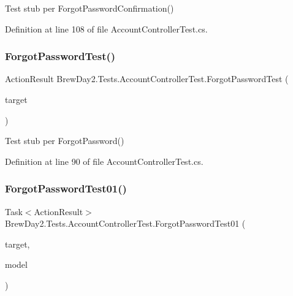 Test stub per Forgot\+Password\+Confirmation()



Definition at line 108 of file Account\+Controller\+Test.\+cs.

\mbox{\label{class_brew_day2_1_1_tests_1_1_account_controller_test_a3b8646f50c34fc99c5767b20461b66cf}} 
\subsubsection{\texorpdfstring{Forgot\+Password\+Test()}{ForgotPasswordTest()}}
{\footnotesize\ttfamily Action\+Result Brew\+Day2.\+Tests.\+Account\+Controller\+Test.\+Forgot\+Password\+Test (\begin{DoxyParamCaption}\item[{\mbox{[}\+Pex\+Assume\+Under\+Test\mbox{]} \mbox{\hyperlink{class_brew_day2_1_1_controllers_1_1_account_controller}{Account\+Controller}}}]{target }\end{DoxyParamCaption})}



Test stub per Forgot\+Password()



Definition at line 90 of file Account\+Controller\+Test.\+cs.

\mbox{\label{class_brew_day2_1_1_tests_1_1_account_controller_test_a11dd2465f4643196ccf6b56cf41d7841}} 
\subsubsection{\texorpdfstring{Forgot\+Password\+Test01()}{ForgotPasswordTest01()}}
{\footnotesize\ttfamily Task$<$Action\+Result$>$ Brew\+Day2.\+Tests.\+Account\+Controller\+Test.\+Forgot\+Password\+Test01 (\begin{DoxyParamCaption}\item[{\mbox{[}\+Pex\+Assume\+Under\+Test\mbox{]} \mbox{\hyperlink{class_brew_day2_1_1_controllers_1_1_account_controller}{Account\+Controller}}}]{target,  }\item[{\mbox{\hyperlink{class_brew_day2_1_1_models_1_1_forgot_password_view_model}{Forgot\+Password\+View\+Model}}}]{model }\end{DoxyParamCaption})}



